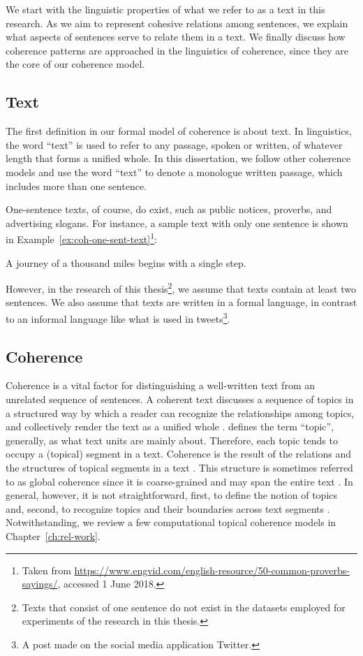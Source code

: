 We start with the linguistic properties of what we refer to as a text in this research. 
As we aim to represent cohesive relations among sentences, we explain what aspects of sentences serve to relate them in a text. 
We finally discuss how coherence patterns are approached in the linguistics of coherence, since they are the core of our coherence model.  

\subsection{Text}

The first definition in our formal model of coherence is about text. 
In linguistics, the word ``text'' is used to refer to any passage, spoken or written, of whatever length that forms a unified whole.  
In this dissertation, we follow other coherence models \cite{barzilay08,guinaudeau13} and use the word ``text'' to denote a  monologue written passage, which includes more than one sentence.

One-sentence texts, of course, do exist, such as public notices, proverbs, and advertising slogans.  
For instance, a sample text with only one sentence is shown in Example~\ref{ex:coh-one-sent-text}\footnote{Taken from \url{https://www.engvid.com/english-resource/50-common-proverbs-sayings/}, accessed 1 June 2018.}: 

\begin{examples}
    \label{ex:coh-one-sent-text}
    A journey of a thousand miles begins with a single step.
\end{examples}

However, in the research of this thesis\footnote{Texts that consist of one sentence do not exist in the datasets employed for experiments of the research in this thesis.}, we assume that texts contain at least two sentences. 
We also assume that texts are written in a formal language, in contrast to an informal language like what is used in tweets\footnote{A post made on the social media application Twitter.}. 

\subsection{Coherence}

Coherence is a vital factor for distinguishing a well-written text from an unrelated sequence of sentences. 
A coherent text discusses a sequence of topics in a structured way by which a reader can recognize the relationships among topics, and collectively render the text as a unified whole \cite{stede12}. 
 defines the term ``topic'',  generally, as what text units are mainly about.   
Therefore, each topic tends to occupy a (topical) segment in a text. 
Coherence is the result of the relations and the structures of topical segments in a text \cite{hearst97}. 
This structure is sometimes referred to as global coherence since it is coarse-grained and may span the entire text \cite{elsner07}. 
In general, however, it is not straightforward, first, to define the notion of topics and, second, to recognize topics and their boundaries across text segments \cite{stede12}. 
Notwithstanding, we review a few computational topical coherence models in Chapter~\ref{ch:rel-work}. 

